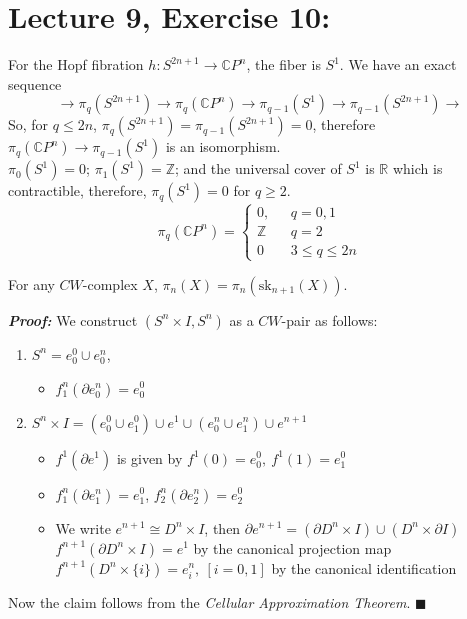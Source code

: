 \documentclass[11pt]{article}
\numberwithin{equation}{section}
\begin{document}
\section{\normalsize{Lecture 9, Exercise 10:}}
For the Hopf fibration $h:S^{2n+1}\rightarrow \mathbb{C}P^n$, the fiber is $S^1$. We have an exact sequence
$$\rightarrow \pi_q(S^{2n+1})\rightarrow \pi_q(\mathbb{C}P^n) \rightarrow \pi_{q-1}(S^1) \rightarrow \pi_{q-1}(S^{2n+1})\rightarrow$$
So, for $q\leqslant2n$, $\pi_q(S^{2n+1})=\pi_{q-1}(S^{2n+1})=0$, therefore $\pi_q(\mathbb{C}P^n)\rightarrow \pi_{q-1}(S^1)$ is an isomorphism. \\[8pt]
$\pi_0(S^1) = 0$; $\pi_1(S^1) = \mathbb{Z}$; and the universal cover of $S^1$ is $\mathbb{R}$ which is contractible, therefore, $\pi_q(S^1)=0$ for $q\geqslant 2$.
$$\pi_q(\mathbb{C}P^n)= 
\begin{cases}
0, & \ \ \ q=0,1\\ 
\mathbb{Z}& \ \ \ q=2 \\ 
0& \ \ \ 3\leqslant q\leqslant 2n
\end{cases}
$$
\begin{clm}
For any $CW$-complex $X$, $\pi_n(X)=\pi_n(\text{sk}_{n+1}(X))$. 
\end{clm}
\textbf{\emph{Proof:}}
We construct $(S^n\times I, S^n)$ as a $CW$-pair as follows: 
\begin{enumerate}
\item $S^n = e^0_0\cup e^n_0$, 
\begin{itemize}
\item $f^n_1(\partial e^n_0) = e^0_0$
\end{itemize}
\item $S^n\times I = (e^0_0\cup e^0_1)\cup e^1\cup (e^n_0\cup e^n_1)\cup e^{n+1}$
\begin{itemize}
\item $f^1(\partial e^1)$ is given by $f^1(0)=e^0_0,\ f^1(1)=e^0_1$
\item $f^n_1(\partial e^n_1) = e^0_1$, $f^n_2(\partial e^n_2) = e^0_2$
\item We write $e^{n+1}\cong D^n\times I$, then $\partial e^{n+1} = (\partial D^n\times I)\cup(D^n\times \partial I)$ \\ $f^{n+1}(\partial D^n\times I) = e^1$ by the canonical projection map \\ $f^{n+1}(D^n\times \{i\}) = e^n_i,\ [i=0,1]$ by the canonical identification
\end{itemize}
\end{enumerate}
Now the claim follows from the \emph{Cellular Approximation Theorem}. $\blacksquare$\\[8pt] 
\end{document}
